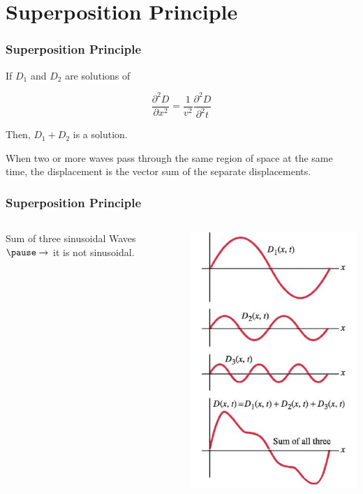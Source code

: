 \documentclass[]{beamer}
\begin{document}

\section{Superposition Principle}

\begin{frame}
\frametitle{Superposition Principle}

If $D_1$ and $D_2$ are solutions of 

\begin{equation*}
\frac{\partial^2D}{\partial x^2}=\frac{1}{v^2} \frac{\partial^2D}{\partial^2 t}
\end{equation*}

\vspace{3mm}

Then,  $D_1+D_2$ is  a solution.
\vspace{3mm}

\pause

When two or more waves pass through the same region of space at the same time,
 the displacement is the vector sum of the separate displacements.


  \end{frame}







\begin{frame}
\frametitle{Superposition Principle}



   \begin{columns}[c]
   \column{2in}  %
  
Sum of three  sinusoidal Waves $\pause \rightarrow$ it is not sinusoidal.

   \column{2in}


  \begin{center}
  \includegraphics[height=2.in]{images4/11.jpg}
\end{center}


   \end{columns}




  \end{frame}
\end{document}
